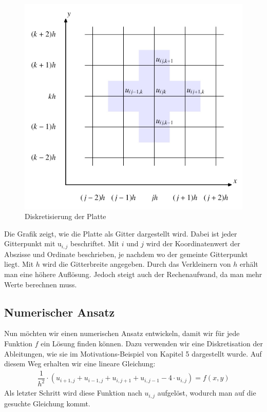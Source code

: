 \begin{refsection}
\begin{figure}
\centering
\includegraphics[width=0.5\hsize]{potential/images/diskretisierung/gitternetz.jpg}
\caption{Diskretisierung der Platte\label{potential:gitternetz}}
\end{figure}

Die Grafik zeigt, wie die Platte als Gitter dargestellt
wird. Dabei ist jeder Gitterpunkt mit u$_{i,j}$ beschriftet. Mit $i$ und
$j$ wird der Koordinatenwert der Abszisse und Ordinate beschrieben, je
nachdem wo der gemeinte Gitterpunkt liegt. Mit $h$ wird die Gitterbreite
angegeben. Durch das Verkleinern von $h$ erh\"alt man eine h\"ohere
Aufl\"osung. Jedoch steigt auch der Rechenaufwand, da man mehr Werte
berechnen muss.

\subsection{Numerischer Ansatz}
Nun m\"ochten wir einen numerischen Ansatz entwickeln, damit wir f\"ur
jede Funktion $f$ ein L\"osung finden k\"onnen. Dazu verwenden wir eine
Diskretisation der Ableitungen, wie sie im Motivations-Beispiel von
Kapitel 5 dargestellt wurde. Auf diesem Weg erhalten wir eine lineare
Gleichung:
\begin{eqnarray}\label{eq:gleichung}
\dfrac{1}{h^{2}}\cdot(u_{i+1,j}+u_{i-1,j}+u_{i,j+1}+u_{i,j-1}-4\cdot u_{i,j}) = f(x,y)
\end{eqnarray}
Als letzter Schritt wird diese Funktion nach $u_{i,j}$ aufgel\"ost,
wodurch man auf die gesuchte Gleichung kommt.


\end{refsection}
